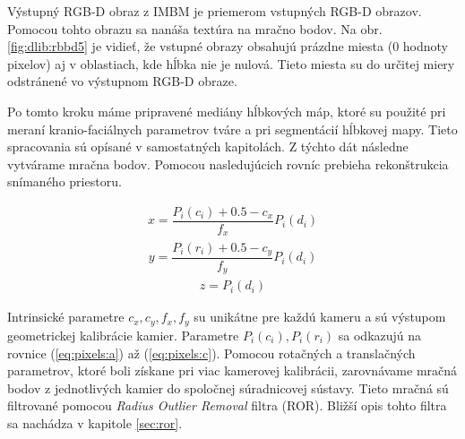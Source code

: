 Výstupný RGB-D obraz z IMBM je priemerom vstupných RGB-D obrazov. Pomocou tohto obrazu sa nanáša textúra na mračno bodov. Na obr. \ref{fig:dlib:rbbd5} je vidieť, že vstupné obrazy obsahujú prázdne miesta (0 hodnoty pixelov) aj v oblastiach, kde hĺbka nie je nulová.
Tieto miesta su do určitej miery odstránené vo výstupnom RGB-D obraze.



Po tomto kroku máme pripravené mediány hĺbkových máp, ktoré su použité pri meraní kranio-faciálnych parametrov tváre a pri segmentácií hĺbkovej mapy. Tieto spracovania sú opísané v samostatných kapitolách. Z týchto dát následne vytvárame mračna bodov. Pomocou nasledujúcich rovníc prebieha rekonštrukcia snímaného priestoru. 

\begin{equation}
\label{eq:project:x}
\begin{aligned}
x=\dfrac{P_{i}(c_{i})+0.5-c_{x}}{f_{x}}P_{i}(d_{i})
\end{aligned}
\end{equation}
\begin{equation}
\label{eq:project:y}
\begin{aligned}
y=\dfrac{P_{i}(r_{i})+0.5-c_{y}}{f_{y}}P_{i}(d_{i})
\end{aligned}
\end{equation}
\begin{equation}
\label{eq:project:z}
\begin{aligned}
z=P_{i}(d_{i})
\end{aligned}
\end{equation}

Intrinsické parametre $c_x, c_y, f_x, f_y$ su unikátne pre každú kameru a sú výstupom geometrickej kalibrácie kamier. Parametre $P_i(c_i),P_i(r_i)$ sa odkazujú na rovnice (\ref{eq:pixels:a}) až (\ref{eq:pixels:c}). Pomocou rotačných a translačných parametrov, ktoré boli získane pri viac kamerovej kalibrácii, zarovnávame mračná bodov z jednotlivých kamier do spoločnej súradnicovej sústavy. Tieto mračná sú filtrované pomocou \textit{Radius Outlier Removal} filtra (ROR). Bližší opis tohto filtra sa nachádza v kapitole \ref{sec:ror}. 


